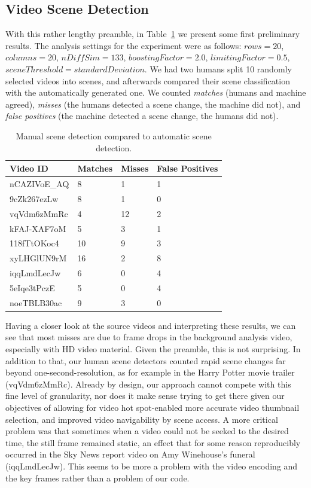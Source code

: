 \documentclass[10pt,twocolumn,letterpaper]{article}
\begin{document}
\subsection{Video Scene Detection}
With this rather lengthy preamble, in Table~\ref{table:results} we present some first preliminary results. The analysis settings for the experiment were as follows: $rows = 20$, $columns = 20$, $nDiffSim = 133$, $boostingFactor = 2.0$, $limitingFactor = 0.5$, $sceneThreshold = standardDeviation$. We had two humans split 10 randomly selected videos into scenes, and afterwards compared their scene classification with the automatically generated one. We counted \emph{matches} (humans and machine agreed), \emph{misses} (the humans detected a scene change, the machine did not), and \emph{false positives} (the machine detected a scene change, the humans did not). 

\begin{table}
\begin{center}  
    \begin{tabular}{ | l | l | l | l |}
    \hline
    \textbf{Video ID} & \textbf{Matches} & \textbf{Misses} & \textbf{False Positives} \\ \hline
    nCAZIVoE\_AQ & 8 & 1 & 1 \\ \hline
    9cZk267ezLw & 8 & 1 & 0	 \\ \hline
    vqVdm6zMmRc & 4 & 12 & 2 \\ \hline
    kFAJ-XAF7oM & 5 & 3 & 1 \\ \hline
    118fTtOKoc4 & 10 & 9 & 3 \\ \hline
    xyLHGlUN9rM & 16 & 2 & 8 \\ \hline
    iqqLmdLecJw & 6 & 0 & 4 \\ \hline
    5eIqe3tPczE & 5 & 0 & 4 \\ \hline
    noeTBLB30ac & 9 & 3 & 0 \\ \hline
    \hline
    \end{tabular}
\end{center}
\caption{Manual scene detection compared to automatic scene detection.}
\label{table:results}
\end{table}

Having a closer look at the source videos and interpreting these results, we can see that most misses are due to frame drops in the background analysis video, especially with HD video material. Given the preamble, this is not surprising. In addition to that, our human scene detectors counted rapid scene changes far beyond one-second-resolution, as for example in the Harry Potter movie trailer (vqVdm6zMmRc). Already by design, our approach cannot compete with this fine level of granularity, nor does it make sense trying to get there given our objectives of allowing for video hot spot-enabled more accurate video thumbnail selection, and improved video navigability by scene access. A more critical problem was that sometimes when a video could not be seeked to the desired time, the still frame remained static, an effect that for some reason reproducibly occurred in the Sky News report video on Amy Winehouse's funeral (iqqLmdLecJw). This seems to be more a problem with the video encoding and the key frames rather than a problem of our code. 
\end{document}
